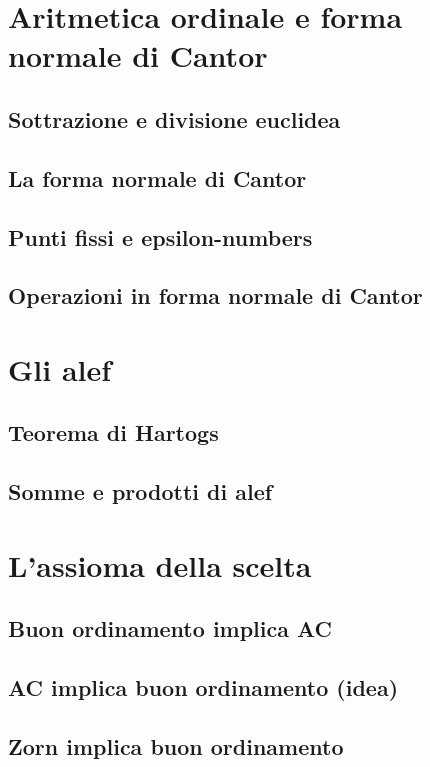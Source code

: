 \documentclass[11pt]{scrartcl}
\begin{document}
\section{Aritmetica ordinale e forma normale di Cantor}
\subsection{Sottrazione e divisione euclidea}
\newpage
\subsection{La forma normale di Cantor}
\newpage
\subsection{Punti fissi e epsilon-numbers}
\newpage
\subsection{Operazioni in forma normale di Cantor}
\newpage





\newpage
\section{Gli alef}
\subsection{Teorema di Hartogs}
\newpage
\subsection{Somme e prodotti di alef}



\newpage
\section{L'assioma della scelta}
\subsection{Buon ordinamento implica AC}
\newpage
\subsection{AC implica buon ordinamento (idea)}
\newpage
\subsection{Zorn implica buon ordinamento}
\newpage
\end{document}
